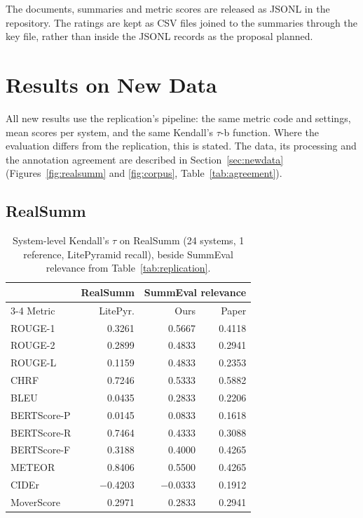 \documentclass[11pt]{article}
\begin{document}
The documents, summaries and metric scores are released as JSONL in the repository. The ratings are kept as CSV files joined to the summaries through the key file, rather than inside the JSONL records as the proposal planned.

\section{Results on New Data}
\label{sec:results}

All new results use the replication's pipeline: the same metric code and settings, mean scores per system, and the same Kendall's $\tau$-b function. Where the evaluation differs from the replication, this is stated. The data, its processing and the annotation agreement are described in Section~\ref{sec:newdata} (Figures~\ref{fig:realsumm} and \ref{fig:corpus}, Table~\ref{tab:agreement}).

\subsection{RealSumm}
\label{sec:res-realsumm}

\begin{table}[t]
\centering
\small
\begin{tabular}{@{}lrrr@{}}
\toprule
& RealSumm & \multicolumn{2}{c}{SummEval relevance} \\
\cmidrule(l){3-4}
Metric & LitePyr. & Ours & Paper \\
\midrule
ROUGE-1 & 0.3261 & 0.5667 & 0.4118 \\
ROUGE-2 & 0.2899 & 0.4833 & 0.2941 \\
ROUGE-L & 0.1159 & 0.4833 & 0.2353 \\
CHRF & 0.7246 & 0.5333 & 0.5882 \\
BLEU & 0.0435 & 0.2833 & 0.2206 \\
BERTScore-P & 0.0145 & 0.0833 & 0.1618 \\
BERTScore-R & 0.7464 & 0.4333 & 0.3088 \\
BERTScore-F & 0.3188 & 0.4000 & 0.4265 \\
METEOR & 0.8406 & 0.5500 & 0.4265 \\
CIDEr & $-$0.4203 & $-$0.0333 & 0.1912 \\
MoverScore & 0.2971 & 0.2833 & 0.2941 \\
\bottomrule
\end{tabular}
\caption{System-level Kendall's $\tau$ on RealSumm (24 systems, 1 reference, LitePyramid recall), beside SummEval relevance from Table~\ref{tab:replication}.}
\label{tab:realsumm}
\end{table}
\end{document}
